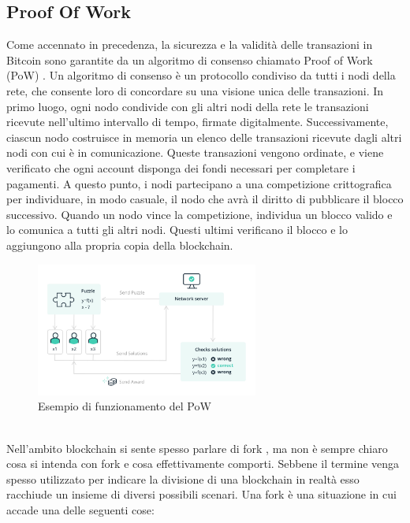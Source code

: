 \subsection{Proof Of Work}
Come accennato in precedenza, la sicurezza e la validità delle transazioni in Bitcoin sono garantite da un algoritmo di consenso chiamato Proof of Work (PoW) \cite{Blockchain_guida_allecosistema}. Un algoritmo di consenso è un protocollo condiviso da tutti i nodi della rete, che consente loro di concordare su una visione unica delle transazioni.
In primo luogo, ogni nodo condivide con gli altri nodi della rete le transazioni ricevute nell’ultimo intervallo di tempo, firmate digitalmente. Successivamente, ciascun nodo costruisce in memoria un elenco delle transazioni ricevute dagli altri nodi con cui è in comunicazione. Queste transazioni vengono ordinate, e viene verificato che ogni account disponga dei fondi necessari per completare i pagamenti.
A questo punto, i nodi partecipano a una competizione crittografica per individuare, in modo casuale, il nodo che avrà il diritto di pubblicare il blocco successivo. Quando un nodo vince la competizione, individua un blocco valido e lo comunica a tutti gli altri nodi. Questi ultimi verificano il blocco e lo aggiungono alla propria copia della blockchain.
\begin{figure}[h]
\caption{Esempio di funzionamento del PoW}
\centering
\includegraphics[width=0.65\textwidth]{Immagini/proof of work scheme.jpg}
\end{figure}
\\
Nell’ambito blockchain si sente spesso parlare di fork \cite{Blockchain_tecnologia_e_applicazioni_per_il_business}, ma non è sempre chiaro cosa si intenda con fork e cosa effettivamente comporti. Sebbene il termine venga spesso utilizzato per indicare la divisione di una blockchain in realtà esso racchiude un insieme di diversi possibili scenari. 
Una fork è una situazione in cui accade una delle seguenti cose:
